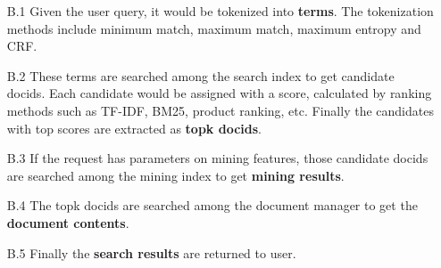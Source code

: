 \begin{enumerate}
\item[B.1] Given the user query, it would be tokenized into \textbf{terms}.
The tokenization methods include minimum match, maximum match, maximum entropy and CRF.

\item[B.2] These terms are searched among the search index to get candidate docids.
Each candidate would be assigned with a score, calculated by ranking methods such as TF-IDF, BM25, product ranking, etc.
Finally the candidates with top scores are extracted as \textbf{topk docids}.

\item[B.3] If the request has parameters on mining features, those candidate docids are searched among the mining index to get \textbf{mining results}.

\item[B.4] The topk docids are searched among the document manager to get the \textbf{document contents}.

\item[B.5] Finally the \textbf{search results} are returned to user.

\end{enumerate}

